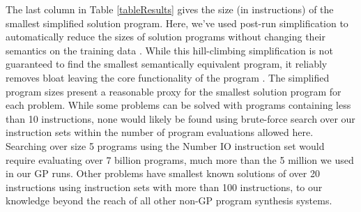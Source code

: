 \documentclass{sig-alternate}
\begin{document}
The last column in Table \ref{tableResults} gives the size (in instructions) of the  smallest simplified solution program. Here, we've used post-run simplification to automatically reduce the sizes of solution programs without changing their semantics on the training data \cite{Spector:2014:GECCOcomp}. While this hill-climbing simplification is not guaranteed to find the smallest semantically equivalent program, it reliably removes bloat leaving the core functionality of the program \cite{Spector:2014:GECCOcomp}. The simplified program sizes present a reasonable proxy for the smallest solution program for each problem. While some problems can be solved with programs containing less than 10 instructions, none would likely be found using brute-force search over our instruction sets within the number of program evaluations allowed here. Searching over size 5 programs using the Number IO instruction set would require evaluating over 7 billion programs, much more than the 5 million we used in our GP runs. Other problems have smallest known solutions of over 20 instructions using instruction sets with more than 100 instructions, to our knowledge beyond the reach of all other non-GP program synthesis systems.

\end{document}
